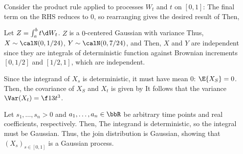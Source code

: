 \documentclass{article}
\begin{document}

Consider the product rule applied to processes $W_t$ and $t$ on $[0,1]$:
The final term on the RHS reduces to $0$, so rearranging gives the
desired result of
Then,


Let $Z=\int_a^b t\d W_t$. $Z$ is a $0$-centered Gaussian with variance
Thus, $X\sim\calN(0,1/24)$, $Y\sim\calN(0,7/24)$, and
Then, $X$ and $Y$ are independent since they are integrals of
deterministic function against Brownian increments $[0,1/2]$ and
$[1/2,1]$, which are independent.


Since the integrand of $X_s$ is deterministic, it must have mean $0$:
$\E{X_S}=0$. Then, the covariance of $X_S$ and $X_t$ is given by
It follows that the variance $\Var(X_t)=\f13 t^3$.

Let $s_1,\dots,s_n>0$ and $a_1,\dots,a_n\in\bbR$ be arbitrary time
points and real coefficients, respectively. Then,
The integrand is deterministic, so the integral must be Gaussian.
Thus, the join distribution is Gaussian, showing that
$(X_s)_{s\in[0,1]}$ is a Gaussian process.
\end{document}
